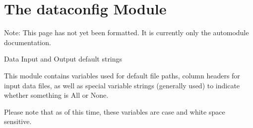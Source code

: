 \documentclass[a4paper,10pt,english]{sphinxmanual}
\begin{document}
\section{The dataconfig Module}
\label{\detokenize{dataconfig:the-dataconfig-module}}\label{\detokenize{dataconfig::doc}}
Note: This page has not yet been formatted. It is currently only the automodule documentation.

\label{\detokenize{dataconfig:module-dataconfig}}
Data Input and Output default strings

This module contains variables used for default file paths, column headers
for input data files, as well as special variable strings (generally used)
to indicate whether something is All or None.

Please note that as of this time, these variables are case and white space
sensitive.
\end{document}
